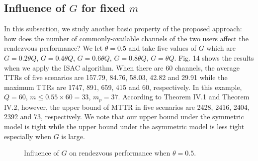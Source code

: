\documentclass[journal]{IEEEtran}
\begin{document}
\subsection{Influence of $G$ for fixed $m$}
In this subsection, we study another basic property of the proposed approach: how does the number of commonly-available channels of the two users affect the rendezvous performance? We let $\theta=0.5$ and take five values of $G$ which are $G=0.2\theta Q$, $G=0.4\theta Q$, $G=0.6\theta Q$, $G=0.8\theta Q$, $G=\theta Q$. Fig. 14 shows the results when we apply the ISAC algorithm. When there are 60 channels, the average TTRs of five scenarios are 157.79, 84.76, 58.03, 42.82 and 29.91 while the maximum TTRs are 1747, 891, 659, 415 and 60, respectively. In this example, $Q=60$, $m\leq0.55\times60=33$, $m_p=37$. According to Theorem IV.1 and Theorem IV.2, however, the upper bound of MTTR in five scenarios are 2428, 2416, 2404, 2392 and 73, respectively. We note that our upper bound under the symmetric model is tight while the upper bound under the asymmetric model is less tight especially when $G$ is large.
\begin{figure}
\centering
{}
\hspace{1in}
\caption{Influence of $G$ on rendezvous performance when $\theta=0.5$.}
\end{figure}
\end{document}
